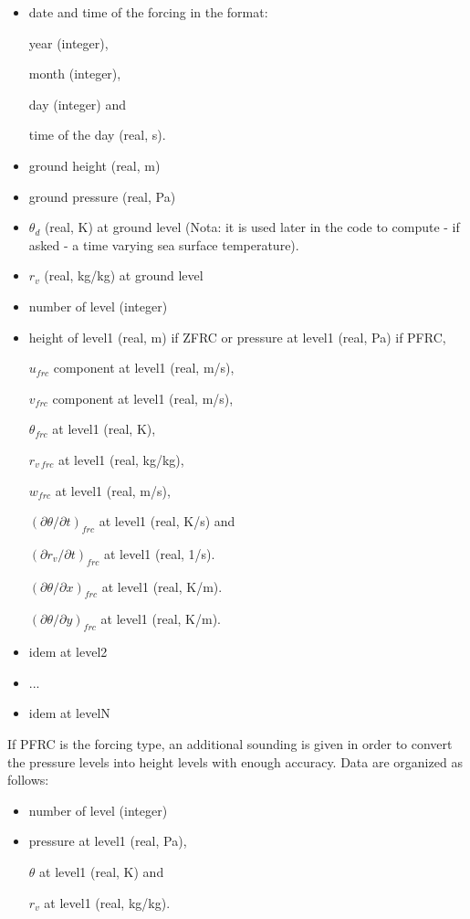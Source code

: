 \begin{itemize}
\item date and time of the forcing in the format:

year (integer),

month (integer),

day (integer) and

time of the day (real, s).
\item ground height (real, m)
\item ground pressure (real, Pa) 
\item $\theta_d$ (real, K) at ground level (Nota: it is used later in
the code to compute - if asked - a time varying sea surface temperature).
\item $r_v$ (real, kg/kg) at ground level
\item number of level (integer)
\item height of level1 (real, m) if ZFRC or pressure at level1 (real, Pa) if
PFRC,

$u_{frc}$ component at level1 (real, m/s),

$v_{frc}$ component at level1 (real, m/s),

$\theta_{frc}$ at level1 (real, K),

$r_{v\ frc}$ at level1 (real, kg/kg),

$w_{frc}$ at level1 (real, m/s),

$(\partial\theta / \partial t)_{frc}$ at level1 (real, K/s) and

$(\partial r_v/ \partial t)_{frc}$ at level1 (real, 1/s).

$(\partial\theta/ \partial x)_{frc}$ at level1 (real, K/m).

$(\partial\theta/ \partial y)_{frc}$ at level1 (real, K/m).

\item idem at level2
\item   ...
\item idem at levelN
\end{itemize}

If PFRC is the forcing type, an additional sounding is given in order to
convert the pressure levels into height levels with enough accuracy. Data
are organized as follows:

\begin{itemize}
\item number of level (integer)
\item pressure at level1 (real, Pa),

$\theta$ at level1 (real, K) and

$r_{v}$ at level1 (real, kg/kg).
\end{itemize}

